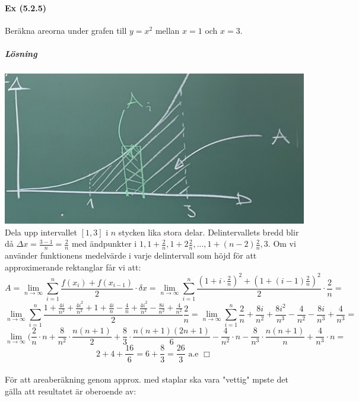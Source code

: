 \paragraph{Ex (5.2.5)} Beräkna areorna under grafen till $y=x^2$ mellan $x=1$ och $x=3$.
\subparagraph*{Lösning}
\includegraphics[scale=0.1]{lessons/lesson14/imgs/img02.jpg}
Dela upp intervallet $[1,3]$ i $n$ stycken lika stora delar.
Delintervallets bredd blir då $\Delta x=\frac{3-1}{n}=\frac{2}{n}$ med ändpunkter i $1,1+\frac{2}{n},1+2\frac{2}{n},...,1+(n-2)\frac{2}{n},3$.
Om vi använder funktionens medelvärde i varje delintervall som höjd för att approximerande rektanglar får vi att:
\begin{equation*}
    A=\lim_{n\to\infty}\sum_{i=1}^n \frac{f(x_i)+f(x_{i-1})}{2}\cdot\delta x=
    \lim_{n\to\infty}\sum_{i=1}^n \frac{(1+i\cdot\frac{2}{n})^2+(1+(i-1)\frac{2}{n})^2}{2}\cdot\frac{2}{n}=
\end{equation*}
\begin{equation*}
    \lim_{n\to\infty}\sum_{i=1}^n\frac{1+\frac{4i}{n^2}+\frac{4i^2}{n^2}+1+\frac{4i}{n}-\frac{4}{n}+\frac{4i^2}{n^2}-\frac{8i}{n^2}+\frac{4}{n^2}}{2}\frac{2}{n}=
    \lim_{n\to\infty}\sum_{i=1}^n\frac{2}{n}+\frac{8i}{n^2}+\frac{8i^2}{n^3}-\frac{4}{n^2}-\frac{8i}{n^3}+\frac{4}{n^3}=
\end{equation*}
\begin{equation*}
    \lim_{n\to\infty}(\frac{2}{n}\cdot n+\frac{8}{n^2}\cdot\frac{n(n+1)}{2}+\frac{8}{3}\cdot\frac{n(n+1)(2n+1)}{6}-\frac{4}{n^2}\cdot n-\frac{8}{n^3}\cdot\frac{n(n+1)}{n}+\frac{4}{n^3}\cdot n=
\end{equation*}
\begin{equation*}
    2+4+\frac{16}{6}=6+\frac{8}{3}=\frac{26}{3}\text{ a.e }\Box
\end{equation*}
~\\
För att areaberäkning genom approx. med staplar ska vara "vettig" mpste det gälla att resultatet är oberoende av:
